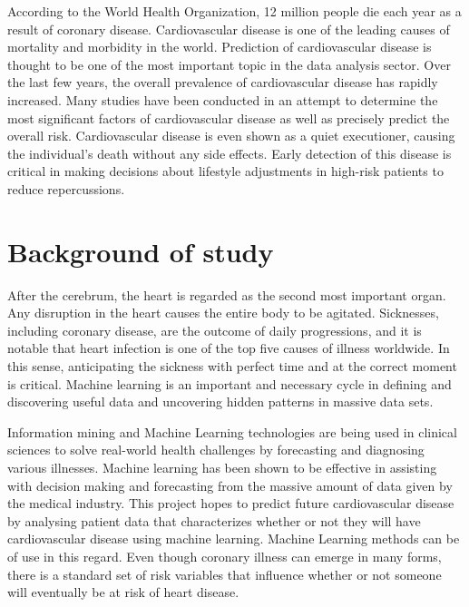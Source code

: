 According to the World Health Organization, 12 million people die each year as a result of coronary disease. Cardiovascular disease is one of the leading causes of mortality and morbidity in the world. Prediction of cardiovascular disease is thought to be one of the most important topic in the data analysis sector. Over the last few years, the overall prevalence of cardiovascular disease has rapidly increased. Many studies have been conducted in an attempt to determine the most significant factors of cardiovascular disease as well as precisely predict the overall risk. Cardiovascular disease is even shown as a quiet executioner, causing the individual's death without any side effects. Early detection of this disease is critical in making decisions about lifestyle adjustments in high-risk patients to reduce repercussions.



\section{Background of study}
After the cerebrum, the heart is regarded as the second most important organ. Any disruption in the heart causes the entire body to be agitated. Sicknesses, including coronary disease, are the outcome of daily progressions, and it is notable that heart infection is one of the top five causes of illness worldwide. In this sense, anticipating the sickness with perfect time and at the correct moment is critical. Machine learning is an important and necessary cycle in defining and discovering useful data and uncovering hidden patterns in massive data sets.

Information mining and Machine Learning technologies are being used in clinical sciences to solve real-world health challenges by forecasting and diagnosing various illnesses.
Machine learning has been shown to be effective in assisting with decision making and forecasting from the massive amount of data given by the medical industry. This project hopes to predict future cardiovascular disease by analysing patient data that characterizes whether or not they will have cardiovascular disease using machine learning. Machine Learning methods can be of use in this regard. Even though coronary illness can emerge in many forms, there is a standard set of risk variables that influence whether or not someone will eventually be at risk of heart disease. 

